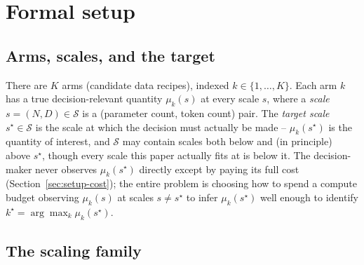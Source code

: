%
%
%

\section{Formal setup}
\label{sec:setup}

\subsection{Arms, scales, and the target}

There are $K$ arms (candidate data recipes), indexed $k \in \{1, \dots, K\}$. Each arm
$k$ has a true decision-relevant quantity $\mu_k(s)$ at every scale $s$, where a
\emph{scale} $s = (N, D) \in \mathcal{S}$ is a (parameter count, token count) pair. The
\emph{target scale} $s^\star \in \mathcal{S}$ is the scale at which the decision must
actually be made -- $\mu_k(s^\star)$ is the quantity of interest, and $\mathcal{S}$ may
contain scales both below and (in principle) above $s^\star$, though every scale this
paper actually fits at is below it. The decision-maker never observes $\mu_k(s^\star)$
directly except by paying its full cost (Section~\ref{sec:setup-cost}); the entire
problem is choosing how to spend a compute budget observing $\mu_k(s)$ at scales
$s \ne s^\star$ to infer $\mu_k(s^\star)$ well enough to identify
$k^\star = \arg\max_k \mu_k(s^\star)$.

\subsection{The scaling family}
\label{sec:setup-family}


